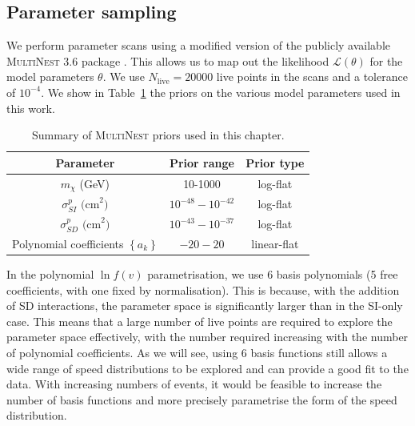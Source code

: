 \subsection{Parameter sampling}
\label{sec:NT:sampling}
We perform parameter scans using a modified version of the publicly available \textsc{MultiNest 3.6} package \cite{Feroz:2007, Feroz:2008, Feroz:2014}. This allows us to map out the likelihood $\mathcal{L}(\theta)$ for the model parameters $\theta$.  We use $N_\textrm{live} = 20000$ live points in the scans and a tolerance of $10^{-4}$. We show in Table~\ref{tab:NT:priors} the priors on the various model parameters used in this work.

\begin{table}
  \setlength{\extrarowheight}{3pt}
  \begin{center}
	\begin{tabular}{ccc}
        \hline\hline
	Parameter & Prior range & Prior type \\
        \hline
        $m_\chi$ (GeV) & 10-1000 & log-flat \\
        $\sigma^p_{SI} \textrm{ (cm}^2\textrm{)}$ & $10^{-48} - 10^{-42}$ & log-flat \\
        $\sigma^p_{SD} \textrm{ (cm}^2\textrm{)}$ & $10^{-43} - 10^{-37}$ & log-flat \\
        Polynomial coefficients $\left\{a_k\right\}$ & $-20 - 20$ & linear-flat \\
        \hline\hline
        \end{tabular}
  \end{center}
\label{tab:NT:priors}
\caption[Summary of the priors on the parameters used in Chapter~\ref{ch:NT}]{Summary of \textsc{MultiNest} priors used in this chapter.}
\end{table}

In the polynomial $\ln f(v)$ parametrisation, we use 6 basis polynomials (5 free coefficients, with one fixed by normalisation). This is because, with the addition of SD interactions, the parameter space is significantly larger than in the SI-only case. This means that a large number of live points are required to explore the parameter space effectively, with the number required increasing with the number of polynomial coefficients. As we will see, using 6 basis functions still allows a wide range of speed distributions to be explored and can provide a good fit to the data. With increasing numbers of events, it would be feasible to increase the number of basis functions and more precisely parametrise the form of the speed distribution.

